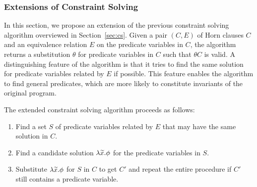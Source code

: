 \subsubsection{Extensions of Constraint Solving}
\label{sec:extcs}

In this section, we propose an extension of the previous constraint
solving algorithm overviewed in Section~\ref{sec:cs}.  Given a pair
\((C,E)\) of Horn clauses \(C\) and an equivalence relation \(E\) on the
predicate variables in \(C\), the algorithm returns a substitution
\(\theta\) for predicate variables in \(C\) such that \(\theta C\) is
valid.  A distinguishing feature of the algorithm is that it tries to
find the same solution for predicate variables related by \(E\) if
possible.  This feature enables the algorithm to find general predicates,
which are more likely to constitute invariants of the original program.


The extended constraint solving algorithm proceeds as follows:
\begin{enumerate}
\item Find a set \(S\) of predicate variables related by \(E\) that may
have the same solution in \(C\).
\item Find a candidate solution \(\lambda \widetilde{x}.\phi\) for the
predicate variables in \(S\).
\item Substitute \(\lambda \widetilde{x}.\phi\) for \(S\) in \(C\) to get
\(C'\) and repeat the entire procedure if \(C'\) still contains a
predicate variable.
\end{enumerate}


